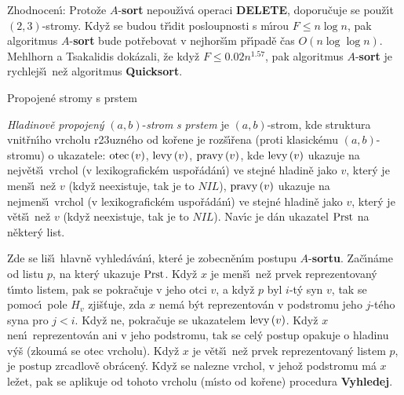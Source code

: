 \flushpar Zhodnocen\'\i : Proto\v ze $A$-{\bf sort} nepou\v z\'\i v\'a operaci 
{\bf DELETE}, doporu\v cuje se pou\v z\'\i t $\left(2,3\right)$-stromy. Kdy\v z se 
budou t\v r\'\i dit posloupnosti s m\'\i rou $F\le n\log n$, pak 
algoritmus $A$-{\bf sort} bude pot\v re\-bo\-vat v nejhor\v s\'\i m p\v r\'\i pad\v e 
\v cas $O\left(n\log\log n\right)$. Mehlhorn a Tsa\-kalidis dok\'azali, \v ze kdy\v z 
$F\le 0.02n^{1.57}$, pak algoritmus $A$-{\bf sort} je rychlej\v s\'\i\ ne\v z 
algoritmus {\bf Quicksort}.

\subhead
Propojen\'e stromy s prstem
\endsubhead

\flushpar\emph{Hladinov\v e} \emph{propojen\'y} $\left(a,b\right)$-\emph{strom} \emph{s} 
\emph{prstem} je $\left(a,b\right)$-strom, kde struktura vnit\v rn\'\i ho 
vrcholu r\accent23uzn\'eho od ko\v rene je 
roz\v s\'\i\v rena (proti klasick\'emu $\left(a,b\right)$-stromu) o 
ukazatele:\newline 
$\operatorname{otec}\left(v\right)$, $\operatorname{levy}\left(v\right)$, $\operatorname{pravy}\left(v\right)$, kde\newline 
$\operatorname{levy}\left(v\right)$ ukazuje na nejv\v et\v s\'\i\ vrchol (v lexikografic\-k\'em 
uspo\v r\'a\-d\'a\-n\'\i ) ve stejn\'e hladin\v e jako $v$, kter\'y je men\v s\'\i\ ne\v z 
$v$ (kdy\v z neexistuje, tak je to $NIL$),\newline 
$\operatorname{pravy}\left(v\right)$ ukazuje na nejmen\v s\'\i\ vrchol (v lexikografic\-k\'em 
uspo\v r\'a\-d\'a\-n\'\i ) ve stejn\'e hladin\v e jako $v$, kter\'y je v\v et\v s\'\i\ ne\v z 
$v$ (kdy\v z ne\-existuje, tak je to $NIL$).\newline 
Nav\'\i c je d\'an ukazatel 
$\operatorname{Prst}$ na n\v ekter\'y list. 
\medskip

\flushpar Zde se li\v s\'\i\ hlavn\v e vyhled\'av\'an\'\i , kter\'e je zobecn\v en\'\i m 
postupu $A$-{\bf sortu}. Za\v c\'\i n\'ame od listu $p$, na kter\'y ukazuje 
$\operatorname{Prst}$. Kdy\v z $x$ je men\v s\'\i\ ne\v z prvek reprezentovan\'y t\'\i mto 
listem, pak se pokra\v cuje v jeho otci $v$, a kdy\v z $p$ 
byl $i$-t\'y syn $v$, tak se pomoc\'\i\ pole $H_v$ zji\v s\v tuje, zda $
x$ 
nem\'a b\'yt reprezentov\'an v podstromu jeho $j$-t\'eho syna pro 
$j<i$. Kdy\v z ne, pokra\v cuje se  ukazatelem $\operatorname{levy}\left(v\right)$. 
Kdy\v z $x$ nen\'\i\ reprezentov\'an ani v jeho podstromu, 
tak se cel\'y postup opakuje o hladinu v\'y\v s (zkoum\'a se otec vrcholu). 
Kdy\v z $x$ je v\v et\v s\'\i\ ne\v z prvek reprezentovan\'y listem $
p$, 
je postup zrcadlov\v e obr\'acen\'y. Kdy\v z se nalezne 
vrchol, v jeho\v z podstromu m\'a $x$ le\v zet, pak se aplikuje od 
tohoto vrcholu (m\'\i sto od ko\v rene) procedura {\bf Vyhledej}.
\newpage

